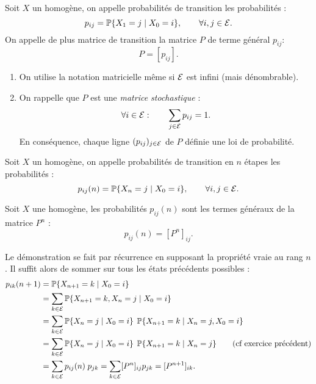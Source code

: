 \begin{definition}
  Soit $X$ un \cM homogène, on appelle probabilités de transition les probabilités :
  $$
  p_{ij} = \operatorname{\mathbb{P}}\{X_1 = j \mid X_0 = i\}, \qquad \forall i, j \in \mathcal{E}.
  $$
  On appelle de plus matrice de transition la matrice $P$ de terme général $p_{ij}$:
  $$
  P = [p_{ij}].
  $$
\end{definition}

\remarks
\begin{enumerate}
  \item On utilise la notation matricielle même si $\mathcal{E}$ est infini (mais dénombrable).
  \item On rappelle que $P$ est une {\em matrice stochastique} : 
  $$
  \forall i \in \mathcal{E}: \qquad \sum_{j \in \mathcal{E}} p_{ij} = 1.
  $$
  En conséquence, chaque ligne $(p_{ij})_{j \in \mathcal{E}}$ de $P$ définie une loi de probabilité.
\end{enumerate}

\begin{definition}
  Soit $X$ un \cM homogène, on appelle probabilités de transition en $n$ étapes les probabilités :
  $$
  p_{ij}(n) = \operatorname{\mathbb{P}}\{X_n = j \mid X_0 = i\}, \qquad \forall i, j \in \mathcal{E}.  
  $$
\end{definition}

\begin{proposition} \label{prop:transitionNEtapes}
  Soit $X$ une \cM homogène, les probabilités $p_{ij}(n)$ sont les termes généraux de la matrice $P^n$ : 
  $$
  p_{ij}(n) = [P^n]_{ij}.
  $$
\end{proposition}

\proof
Le démonstration se fait par récurrence en supposant la propriété vraie au rang $n$. Il suffit alors de sommer sur tous les états précédents possibles : 
\begin{align*}
  p_{ik}(n+1) 
  & = \operatorname{\mathbb{P}}\{X_{n+1} = k \mid X_0=i\} \\
  & = \sum_{k \in \mathcal{E}} \operatorname{\mathbb{P}}\{X_{n+1} = k, X_n = j \mid X_0=i\} \\
  & = \sum_{k \in \mathcal{E}} \operatorname{\mathbb{P}}\{X_n = j \mid X_0=i\} \; \operatorname{\mathbb{P}}\{X_{n+1} = k \mid X_n = j, X_0=i\} \\
  & = \sum_{k \in \mathcal{E}} \operatorname{\mathbb{P}}\{X_n = j \mid X_0=i\} \; \operatorname{\mathbb{P}}\{X_{n+1} = k \mid X_n = j\} \qquad (\text{cf exercice précédent})\\
  & = \sum_{k \in \mathcal{E}} p_{ij}(n) \; p_{jk} = \sum_{k \in \mathcal{E}} [P^n]_{ij} p_{jk} = [P^{n+1}]_{ik}.
\end{align*}
\eproof

